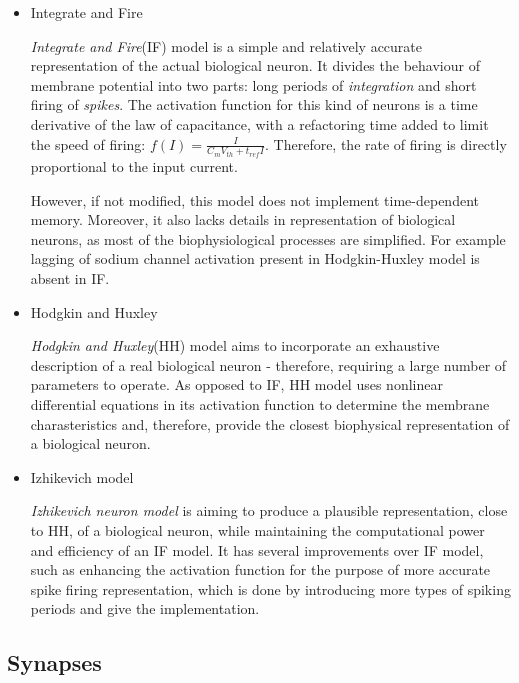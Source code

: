 \documentclass[12pt]{report}
\begin{document}
\begin{itemize}

\item Integrate and Fire

\emph{Integrate and Fire}(IF) model is a simple and relatively accurate representation of the actual biological neuron.
It divides the behaviour of membrane potential into two parts: long periods of \emph{integration} and short firing of \emph{spikes}. The activation function for this kind of neurons is
a time derivative of the law of capacitance, with a refactoring time added to limit the speed of firing: \begin{math}f(I) = \frac{I}{C_{m}V_{th} + t_{ref}I}\end{math}.
Therefore, the rate of firing is directly proportional to the input current.\cite{WulframGerstner2002}

However, if not modified, this model does not implement time-dependent memory. Moreover, it also lacks details in representation of biological neurons, as most of the biophysiological 
processes are simplified. For example lagging of sodium channel activation present in Hodgkin-Huxley model is absent in IF.\cite{IFModel}

\item Hodgkin and Huxley

\emph{Hodgkin and Huxley}(HH) model aims to incorporate an exhaustive description of a real biological neuron - therefore, requiring a large number of parameters to operate.
As opposed to IF, HH model uses nonlinear differential equations in its activation function to determine the membrane charasteristics and, therefore, provide the closest 
biophysical representation of a biological neuron.\cite{Hodgkin1952}

\item Izhikevich model

\emph{Izhikevich neuron model} is aiming to produce a plausible representation, close to HH, of a biological neuron, while maintaining the computational power and efficiency of an IF model.
It has several improvements over IF model, such as enhancing the activation function for the purpose of more accurate spike firing representation, which is done by introducing more 
types of spiking periods and give the implementation.\cite{Izhikevich2003}

\end{itemize}

\subsection{Synapses}
\end{document}
